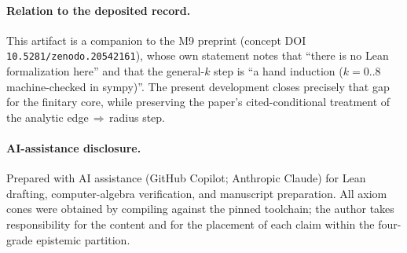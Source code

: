 \documentclass[11pt]{article}
\begin{document}
\paragraph{Relation to the deposited record.}
This artifact is a companion to the M9 preprint (concept DOI
\texttt{10.5281/zenodo.20542161}), whose own statement notes that ``there is no
Lean formalization here'' and that the general-$k$ step is ``a hand induction
($k=0..8$ machine-checked in sympy)''. The present development closes precisely
that gap for the finitary core, while preserving the paper's
cited-conditional treatment of the analytic edge\,$\Rightarrow$\,radius step.

\paragraph{AI-assistance disclosure.}
Prepared with AI assistance (GitHub Copilot; Anthropic Claude) for Lean
drafting, computer-algebra verification, and manuscript preparation. All axiom
cones were obtained by compiling against the pinned toolchain; the author takes
responsibility for the content and for the placement of each claim within the
four-grade epistemic partition.
\end{document}
